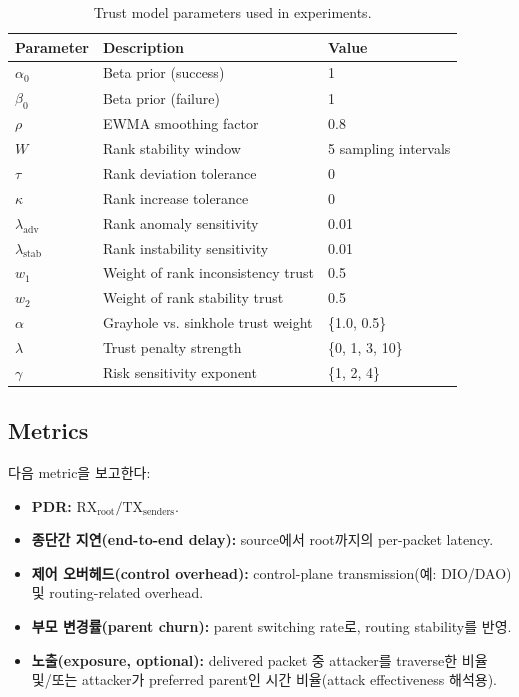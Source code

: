 \documentclass[11pt,a4paper]{article}
\begin{document}
\begin{table}[t]
\centering
\caption{Trust model parameters used in experiments.}
\label{tab:trust-params}
\begin{tabular}{lll}
\toprule
Parameter & Description & Value \\
\midrule
$\alpha_0$ & Beta prior (success) & 1 \\
$\beta_0$  & Beta prior (failure) & 1 \\
$\rho$     & EWMA smoothing factor & 0.8 \\
$W$        & Rank stability window & 5 sampling intervals \\
$\tau$     & Rank deviation tolerance & 0 \\
$\kappa$   & Rank increase tolerance & 0 \\
$\lambda_{\text{adv}}$ & Rank anomaly sensitivity & 0.01 \\
$\lambda_{\text{stab}}$ & Rank instability sensitivity & 0.01 \\
$w_1$      & Weight of rank inconsistency trust & 0.5 \\
$w_2$      & Weight of rank stability trust & 0.5 \\
$\alpha$   & Grayhole vs. sinkhole trust weight & \{1.0, 0.5\} \\
$\lambda$  & Trust penalty strength & \{0, 1, 3, 10\} \\
$\gamma$   & Risk sensitivity exponent & \{1, 2, 4\} \\
\bottomrule
\end{tabular}
\end{table}

\subsection{Metrics}
다음 metric을 보고한다:
\begin{itemize}[leftmargin=*]
  \item \textbf{PDR:} $\mathrm{RX}_{\text{root}} / \mathrm{TX}_{\text{senders}}$.
  \item \textbf{종단간 지연(end-to-end delay):} source에서 root까지의 per-packet latency.
  \item \textbf{제어 오버헤드(control overhead):} control-plane transmission(예: DIO/DAO) 및 routing-related overhead.
  \item \textbf{부모 변경률(parent churn):} parent switching rate로, routing stability를 반영.
  \item \textbf{노출(exposure, optional):} delivered packet 중 attacker를 traverse한 비율 및/또는 attacker가 preferred parent인 시간 비율(attack effectiveness 해석용).
\end{itemize}
\end{document}
